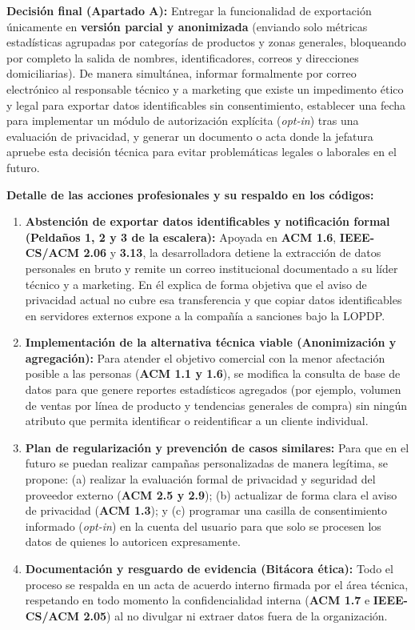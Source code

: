 \documentclass[12pt,a4paper,oneside]{article}
\begin{document}
\begin{destacado}
\textbf{Decisión final (Apartado A):} Entregar la funcionalidad de exportación únicamente en \textbf{versión parcial y anonimizada} (enviando solo métricas estadísticas agrupadas por categorías de productos y zonas generales, bloqueando por completo la salida de nombres, identificadores, correos y direcciones domiciliarias). De manera simultánea, informar formalmente por correo electrónico al responsable técnico y a marketing que existe un impedimento ético y legal para exportar datos identificables sin consentimiento, establecer una fecha para implementar un módulo de autorización explícita (\textit{opt-in}) tras una evaluación de privacidad, y generar un documento o acta donde la jefatura apruebe esta decisión técnica para evitar problemáticas legales o laborales en el futuro.
\end{destacado}

\textbf{Detalle de las acciones profesionales y su respaldo en los códigos:}
\begin{enumerate}[leftmargin=1.8em,itemsep=4pt]
    \item \textbf{Abstención de exportar datos identificables y notificación formal (Peldaños 1, 2 y 3 de la escalera):} Apoyada en \textbf{ACM 1.6}, \textbf{IEEE-CS/ACM 2.06} y \textbf{3.13}, la desarrolladora detiene la extracción de datos personales en bruto y remite un correo institucional documentado a su líder técnico y a marketing. En él explica de forma objetiva que el aviso de privacidad actual no cubre esa transferencia y que copiar datos identificables en servidores externos expone a la compañía a sanciones bajo la LOPDP.
    \item \textbf{Implementación de la alternativa técnica viable (Anonimización y agregación):} Para atender el objetivo comercial con la menor afectación posible a las personas (\textbf{ACM 1.1 y 1.6}), se modifica la consulta de base de datos para que genere reportes estadísticos agregados (por ejemplo, volumen de ventas por línea de producto y tendencias generales de compra) sin ningún atributo que permita identificar o reidentificar a un cliente individual.
    \item \textbf{Plan de regularización y prevención de casos similares:} Para que en el futuro se puedan realizar campañas personalizadas de manera legítima, se propone: (a) realizar la evaluación formal de privacidad y seguridad del proveedor externo (\textbf{ACM 2.5 y 2.9}); (b) actualizar de forma clara el aviso de privacidad (\textbf{ACM 1.3}); y (c) programar una casilla de consentimiento informado (\textit{opt-in}) en la cuenta del usuario para que solo se procesen los datos de quienes lo autoricen expresamente.
    \item \textbf{Documentación y resguardo de evidencia (Bitácora ética):} Todo el proceso se respalda en un acta de acuerdo interno firmada por el área técnica, respetando en todo momento la confidencialidad interna (\textbf{ACM 1.7} e \textbf{IEEE-CS/ACM 2.05}) al no divulgar ni extraer datos fuera de la organización.
\end{enumerate}
\end{document}
